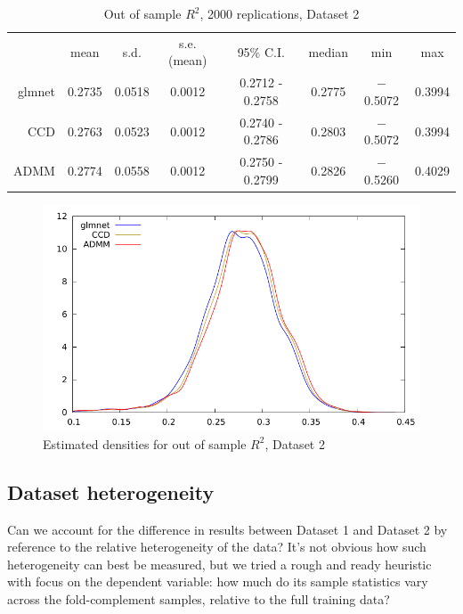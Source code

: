 \documentclass{article}
\begin{document}
\begin{table}[htbp]
  \centering
  \begin{tabular}{rccccccc}
 & mean & s.d. & s.e.(mean) & 95\% C.I. & median & min & max \\
      glmnet & 0.2735 & 0.0518 & 0.0012 & 0.2712 - 0.2758 & 0.2775 & $-$0.5072 & 0.3994 \\
         CCD & 0.2763 & 0.0523 & 0.0012 & 0.2740 - 0.2786 & 0.2803 & $-$0.5072 & 0.3994 \\
        ADMM & 0.2774 & 0.0558 & 0.0012 & 0.2750 - 0.2799 & 0.2826 & $-$0.5260 & 0.4029 \\
  \end{tabular}
  \caption{Out of sample $R^2$, 2000 replications, Dataset 2}
  \label{tab:dset2}
\end{table}

\begin{figure}[htbp]
  \centering
  \includegraphics[scale=0.9]{wine_kd3.pdf} 
  \caption{Estimated densities for out of sample $R^2$, Dataset 2}
  \label{fig:dset2}
\end{figure}

\subsection*{Dataset heterogeneity}

Can we account for the difference in results between Dataset 1 and
Dataset 2 by reference to the relative heterogeneity of the data?
It's not obvious how such heterogeneity can best be measured, but we
tried a rough and ready heuristic with focus on the dependent
variable: how much do its sample statistics vary across the
fold-complement samples, relative to the full training data?
\end{document}
